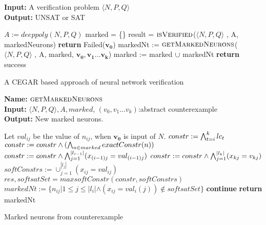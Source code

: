 \begin{algorithm}[t]
  \textbf{Input: } A verification problem $\langle N,P,Q \rangle$ \\
  \textbf{Output: } UNSAT or SAT
  \begin{algorithmic}[1]
    \State $A := deeppoly(N,P,Q)$
    \State marked = \{\}
      \State result = $\textsc{isVerified}$($\langle N,P,Q \rangle$ , A, markedNeurons)
          \State \textbf{return} Failed($\boldsymbol{v_0}$)
        \Else
        \State markedNt := $\textsc{getMarkedNeurons}$($\langle N,P,Q \rangle$ , A, marked, $\boldsymbol{v_0}, \boldsymbol{v_1} ... \boldsymbol{v_k}$)
          \State marked := marked ${\cup}$ markedNt
        \EndIf
      \Else
        \State \textbf{return} success 
      \EndIf
    \EndWhile
  \end{algorithmic}
  \caption{A CEGAR based approach of neural network verification}
  \label{algo:main}
\end{algorithm}

\begin{algorithm}[t]
  \textbf{Name: } $\textsc{getMarkedNeurons}$ \\
  \textbf{Input: } $\langle N,P,Q \rangle,A,marked$, $({v_0}, {v_1} ... {v_k})$:abstract counterexample\\
  \textbf{Output: } New marked neurons. 
  \begin{algorithmic}[1]
    \State Let ${val_{ij}}$ be the value of $n_{ij}$, when $\boldsymbol{v_0}$ is input of $N$. 
     
        \State $constr := \bigwedge_{t=i}^k lc_t$
        \State $constr := constr \land (\bigwedge_{n \in marked} exactConstr(n))$ 
        \State $constr := constr \land \bigwedge_{j=1}^{|l_{i-1}|} (x_{(i-1)j} = val_{(i-1)j})$
        \State $constr := constr \land \bigwedge_{j=1}^{|l_k|} (x_{kj} = v_{kj})$
        \State $softConstrs := \cup_{j=1}^{|l_j|} (x_{ij} = val_{ij})$
        \State $res, softsatSet = maxsoftConstr(constr, softConstrs)$ 
        \State $markedNt := \{n_{ij} | 1 \leq j \leq |l_i| \land (x_{ij} = val_i(j)) \notin  softsatSet\}$ 
          \State \textbf{continue}
        \Else
          \State \textbf{return} markedNt
        \EndIf 
      \EndIf
    \EndFor
  \end{algorithmic}
  \caption{Marked neurons from counterexample}
  \label{algo:refine2}
\end{algorithm}

